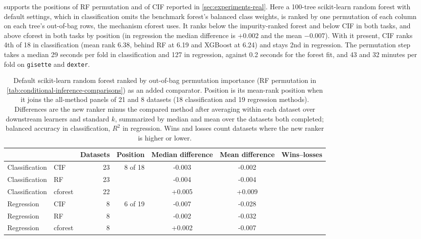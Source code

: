  supports the positions of RF permutation and
of CIF reported in \cref{sec:experiments-real}. Here a 100-tree scikit-learn random forest with default settings, which in
classification omits the benchmark forest's balanced class weights, is ranked by one permutation of each column on each tree's
out-of-bag rows, the mechanism cforest uses. It ranks below the
impurity-ranked forest and below CIF in both tasks, and above cforest in
both tasks by position (in regression the median difference is $+0.002$ and
the mean $-0.007$). With it present, CIF ranks 4th of 18 in classification (mean
rank 6.38, behind RF at 6.19 and XGBoost at 6.24) and stays 2nd in regression.
The permutation step takes a median 29 seconds per fold in classification and
127 in regression, against 0.2 seconds for the forest fit, and 43 and 32
minutes per fold on \nolinkurl{gisette} and \nolinkurl{dexter}.

\begin{table}[tb]
  \centering
  \footnotesize
  \setlength{\tabcolsep}{5pt}
  \begin{tabular}{@{}llrrS[table-format=+1.3]S[table-format=+1.3]c@{}}
    \toprule
     &  & {Datasets} & {Position} & {Median difference} & {Mean difference} & Wins--losses \\
    \midrule
    Classification & CIF & 23 & 8 of 18 & -0.003 & -0.002 &  \\
    Classification & RF & 23 & & -0.004 & -0.004 &  \\
    Classification & cforest & 22 & & +0.005 & +0.009 &  \\
    Regression & CIF & 8 & 6 of 19 & -0.007 & -0.028 &  \\
    Regression & RF & 8 & & -0.002 & -0.032 &  \\
    Regression & cforest & 8 & & +0.002 & -0.007 &  \\
    \bottomrule
  \end{tabular}
  \caption{Default scikit-learn random forest ranked by out-of-bag permutation importance (RF
  permutation in \cref{tab:conditional-inference-comparisons}) as an added
  comparator. Position is its mean-rank position when it joins the all-method
  panels of 21 and 8 datasets (18 classification and 19 regression methods).
  Differences are the new ranker minus the compared method after averaging
  within each dataset over downstream learners and standard $k$, summarized by
  median and mean over the datasets both completed; balanced accuracy in
  classification, $R^2$ in regression. Wins and losses count datasets where the new ranker
  is higher or lower.}
  \label{tab:rf-oobperm-benchmark}
\end{table}

